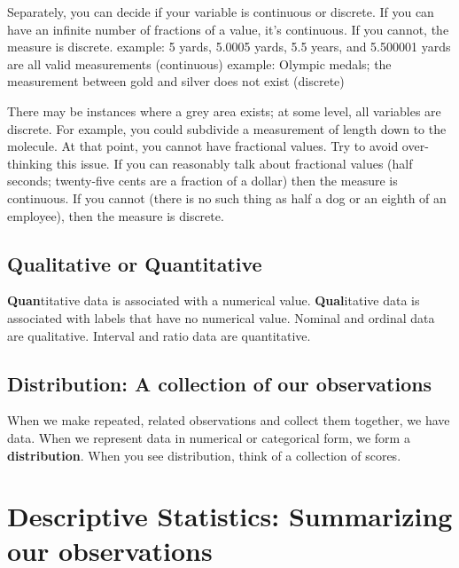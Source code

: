\documentclass[
]{book}
\begin{document}
Separately, you can decide if your variable is continuous or discrete. If you can have an infinite number of fractions of a value, it's continuous. If you cannot, the measure is discrete. example: 5 yards, 5.0005 yards, 5.5 years, and 5.500001 yards are all valid measurements (continuous) example: Olympic medals; the measurement between gold and silver does not exist (discrete)

There may be instances where a grey area exists; at some level, all variables are discrete. For example, you could subdivide a measurement of length down to the molecule. At that point, you cannot have fractional values. Try to avoid over-thinking this issue. If you can reasonably talk about fractional values (half seconds; twenty-five cents are a fraction of a dollar) then the measure is continuous. If you cannot (there is no such thing as half a dog or an eighth of an employee), then the measure is discrete.

\hypertarget{qualitative-or-quantitative}{%
\subsection{Qualitative or Quantitative}\label{qualitative-or-quantitative}}

\textbf{Quan}titative data is associated with a numerical value. \textbf{Qual}itative data is associated with labels that have no numerical value. Nominal and ordinal data are qualitative. Interval and ratio data are quantitative.

\hypertarget{distribution-a-collection-of-our-observations}{%
\subsection{Distribution: A collection of our observations}\label{distribution-a-collection-of-our-observations}}

When we make repeated, related observations and collect them together, we have data. When we represent data in numerical or categorical form, we form a \textbf{distribution}. When you see distribution, think of a collection of scores.

\hypertarget{descriptive-statistics-summarizing-our-observations}{%
\section{Descriptive Statistics: Summarizing our observations}\label{descriptive-statistics-summarizing-our-observations}}
\end{document}
